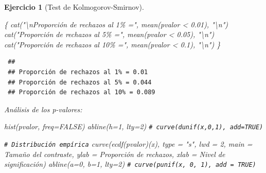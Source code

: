 \documentclass[
  10pt,
]{book}
\newenvironment{Shaded}{\begin{snugshade}}{\end{snugshade}}
\newcommand{\AttributeTok}[1]{\textcolor[rgb]{0.77,0.63,0.00}{#1}}
\newcommand{\CommentTok}[1]{\textcolor[rgb]{0.56,0.35,0.01}{\textit{#1}}}
\newcommand{\ConstantTok}[1]{\textcolor[rgb]{0.00,0.00,0.00}{#1}}
\newcommand{\DecValTok}[1]{\textcolor[rgb]{0.00,0.00,0.81}{#1}}
\newcommand{\FloatTok}[1]{\textcolor[rgb]{0.00,0.00,0.81}{#1}}
\newcommand{\FunctionTok}[1]{\textcolor[rgb]{0.00,0.00,0.00}{#1}}
\newcommand{\NormalTok}[1]{#1}
\newcommand{\SpecialCharTok}[1]{\textcolor[rgb]{0.00,0.00,0.00}{#1}}
\newcommand{\StringTok}[1]{\textcolor[rgb]{0.31,0.60,0.02}{#1}}
\theoremstyle{break}
\newtheorem{exercise}{Ejercicio}[chapter]
\theoremstyle{nonumberplain}
\renewcommand{\CommentTok}[1]{\textcolor[rgb]{0.41,0.41,0.41}{\texttt{#1}}}
\begin{document}
\begin{exercise}[Test de Kolmogorov-Smirnov]
\begin{enumerate}
\begin{Shaded}
\begin{Highlighting}[]
\NormalTok{\{}
  \FunctionTok{cat}\NormalTok{(}\StringTok{"}\SpecialCharTok{\textbackslash{}n}\StringTok{Proporción de rechazos al 1\% ="}\NormalTok{, }\FunctionTok{mean}\NormalTok{(pvalor }\SpecialCharTok{\textless{}} \FloatTok{0.01}\NormalTok{), }\StringTok{"}\SpecialCharTok{\textbackslash{}n}\StringTok{"}\NormalTok{)}
  \FunctionTok{cat}\NormalTok{(}\StringTok{"Proporción de rechazos al 5\% ="}\NormalTok{, }\FunctionTok{mean}\NormalTok{(pvalor }\SpecialCharTok{\textless{}} \FloatTok{0.05}\NormalTok{), }\StringTok{"}\SpecialCharTok{\textbackslash{}n}\StringTok{"}\NormalTok{)}
  \FunctionTok{cat}\NormalTok{(}\StringTok{"Proporción de rechazos al 10\% ="}\NormalTok{, }\FunctionTok{mean}\NormalTok{(pvalor }\SpecialCharTok{\textless{}} \FloatTok{0.1}\NormalTok{), }\StringTok{"}\SpecialCharTok{\textbackslash{}n}\StringTok{"}\NormalTok{)}
\NormalTok{\}}
\end{Highlighting}
\end{Shaded}

\begin{verbatim}
 ## 
 ## Proporción de rechazos al 1% = 0.01 
 ## Proporción de rechazos al 5% = 0.044 
 ## Proporción de rechazos al 10% = 0.089
\end{verbatim}

  Análisis de los p-valores:

\begin{Shaded}
\begin{Highlighting}[]
\FunctionTok{hist}\NormalTok{(pvalor, }\AttributeTok{freq=}\ConstantTok{FALSE}\NormalTok{)}
\FunctionTok{abline}\NormalTok{(}\AttributeTok{h=}\DecValTok{1}\NormalTok{, }\AttributeTok{lty=}\DecValTok{2}\NormalTok{)   }\CommentTok{\# curve(dunif(x,0,1), add=TRUE)}

\CommentTok{\# Distribución empírica}
\FunctionTok{curve}\NormalTok{(}\FunctionTok{ecdf}\NormalTok{(pvalor)(x), }\AttributeTok{type =} \StringTok{"s"}\NormalTok{, }\AttributeTok{lwd =} \DecValTok{2}\NormalTok{, }\AttributeTok{main =} \StringTok{\textquotesingle{}Tamaño del contraste\textquotesingle{}}\NormalTok{, }
      \AttributeTok{ylab =} \StringTok{\textquotesingle{}Proporción de rechazos\textquotesingle{}}\NormalTok{, }\AttributeTok{xlab =} \StringTok{\textquotesingle{}Nivel de significación\textquotesingle{}}\NormalTok{)}
\FunctionTok{abline}\NormalTok{(}\AttributeTok{a=}\DecValTok{0}\NormalTok{, }\AttributeTok{b=}\DecValTok{1}\NormalTok{, }\AttributeTok{lty=}\DecValTok{2}\NormalTok{)   }\CommentTok{\# curve(punif(x, 0, 1), add = TRUE)}
\end{Highlighting}
\end{Shaded}


\end{enumerate}
\end{exercise}
\end{document}
